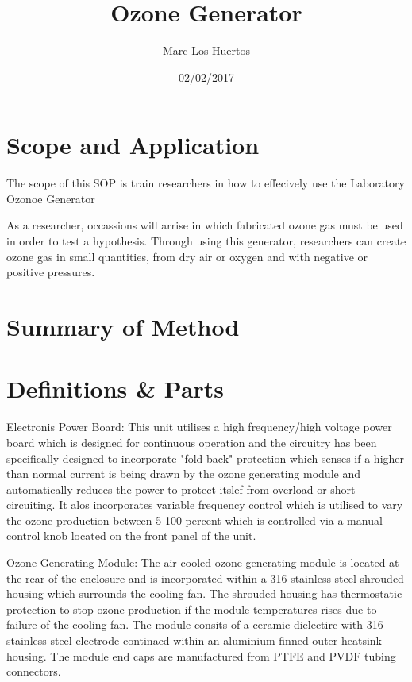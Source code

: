 \documentclass[12pt]{../SOP2}
\title{Ozone Generator}
\date{02/02/2017}
\author{Marc Los Huertos}
\begin{document}


\maketitle

\section{Scope and Application}

\NP The scope of this SOP is train researchers in how to effecively use the Laboratory Ozonoe Generator 

\NP As a researcher, occassions will arrise in which fabricated ozone gas must be used in order to test a hypothesis. Through using this generator, researchers can create ozone gas in small quantities, from dry air or oxygen and with negative or positive pressures. 

\section{Summary of Method}

\section{Definitions & Parts}

\NP Electronis Power Board: This unit utilises a high frequency/high voltage power board which is designed for continuous operation and the circuitry has been specifically designed to incorporate "fold-back" protection which senses if a higher than normal current is being drawn by the ozone generating module and automatically reduces the power to protect itslef from overload or short circuiting. It alos incorporates variable frequency control which is utilised to vary the ozone production between 5-100 percent which is controlled via a manual control knob located on the front panel of the unit. 

\NP Ozone Generating Module: The air cooled ozone generating module is located at the rear of the enclosure and is incorporated within a 316 stainless steel shrouded housing which surrounds the cooling fan. The shrouded housing has thermostatic protection to stop ozone production if the module temperatures rises due to failure of the cooling fan.
\NP The module consits of a ceramic dielectirc with 316 stainless steel electrode continaed within an aluminium finned outer heatsink housing. The module end caps are manufactured from PTFE and PVDF tubing connectors. 
  
\end{document}
